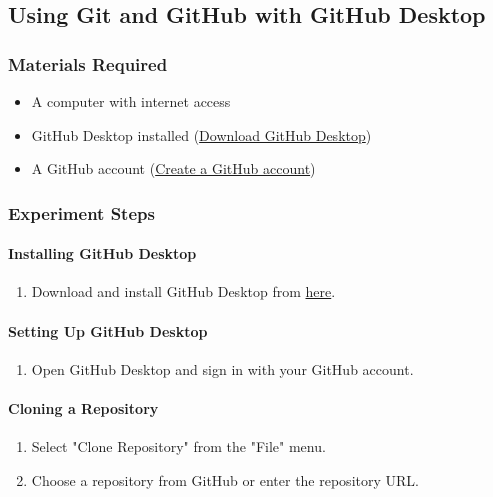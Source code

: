\subsection{Using Git and GitHub with GitHub Desktop}

\subsubsection{Materials Required}

\begin{itemize}
    \item A computer with internet access
    \item GitHub Desktop installed (\href{https://desktop.github.com/}{Download GitHub Desktop})
    \item A GitHub account (\href{https://github.com/join}{Create a GitHub account})
\end{itemize}

\subsubsection{Experiment Steps}

\paragraph{Installing GitHub Desktop}
\begin{enumerate}
    \item Download and install GitHub Desktop from \href{https://desktop.github.com/}{here}.
\end{enumerate}

\paragraph{Setting Up GitHub Desktop}
\begin{enumerate}
    \item Open GitHub Desktop and sign in with your GitHub account.
\end{enumerate}

\paragraph{Cloning a Repository}
\begin{enumerate}
    \item Select "Clone Repository" from the "File" menu.
    \item Choose a repository from GitHub or enter the repository URL.
\end{enumerate}

